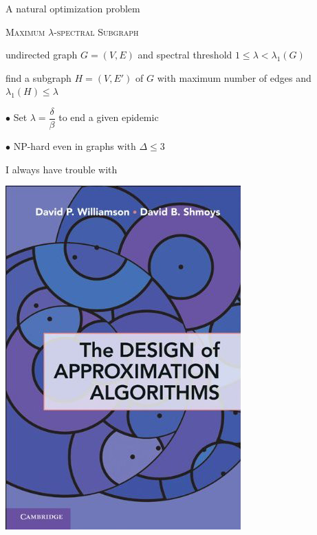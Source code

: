 \documentclass[14pt]{beamer}
\begin{document}
\begin{frame}{A natural optimization problem}
\begin{fullpagedescription}
\item[Problem:] \textsc{Maximum $\lambda$-spectral Subgraph}
\item[Instance:] undirected graph $G = (V, E)$ and spectral threshold $1 \leq \lambda < \lambda_1(G)$
\item[Task:] find a subgraph $H = (V, E')$ of $G$ with maximum number of edges and $\lambda_1(H) \leq \lambda$
\end{fullpagedescription}
\begin{fullpageitemize}
\item $\bullet$ Set $\lambda = \dfrac{\delta}{\beta}$ to end a given epidemic
\item $\bullet$ NP-hard even in graphs with $\Delta \leq 3$
\end{fullpageitemize}
\end{frame}

\begin{frame}{I always have trouble with}
\begin{center}
    \includegraphics[height=0.87\textheight]{images/design-approx-cover.png}
\end{center}
\end{frame}
\end{document}

